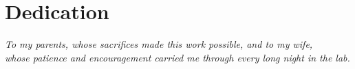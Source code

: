\chapter*{Dedication}
\vspace{2cm}
\begin{center}
\textit{To my parents, whose sacrifices made this work possible, and to my wife,\\
whose patience and encouragement carried me through every long night in the lab.}
\end{center}
